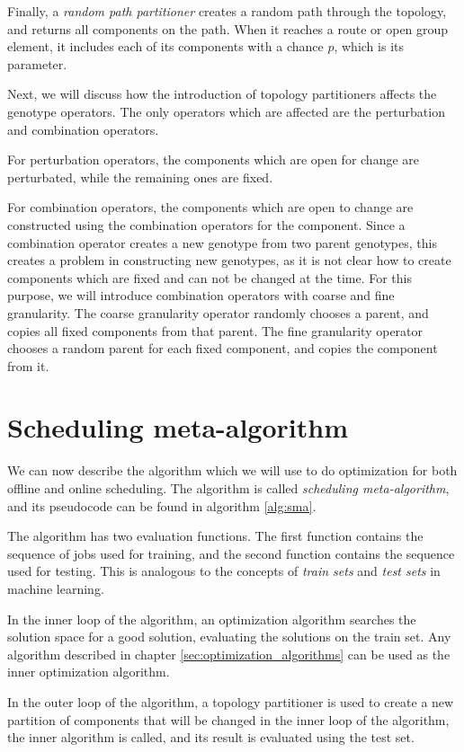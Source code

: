 Finally, a \textit{random path partitioner} creates a random path through the topology, and returns all components on the path. When it reaches a route or open group element, it includes each of its components with a chance $p$, which is its parameter.

Next, we will discuss how the introduction of topology partitioners affects the genotype operators. The only operators which are affected are the perturbation and combination operators.

For perturbation operators, the components which are open for change are perturbated, while the remaining ones are fixed. 

For combination operators, the components which are open to change are constructed using the combination operators for the component. Since a combination operator creates a new genotype from two parent genotypes, this creates a problem in constructing new genotypes, as it is not clear how to create components which are fixed and can not be changed at the time. For this purpose, we will introduce combination operators with coarse and fine granularity. The coarse granularity operator randomly chooses a parent, and copies all fixed components from that parent. The fine granularity operator chooses a random parent for each fixed component, and copies the component from it.

\section{Scheduling meta-algorithm}
\label{sec:scheduling_meta_algorithm}

We can now describe the algorithm which we will use to do optimization for both offline and online scheduling. The algorithm is called \textit{scheduling meta-algorithm}, and its pseudocode can be found in algorithm \ref{alg:sma}.

The algorithm has two evaluation functions. The first function contains the sequence of jobs used for training, and the second function contains the sequence used for testing. This is analogous to the concepts of \textit{train sets} and \textit{test sets} in machine learning.

In the inner loop of the algorithm, an optimization algorithm searches the solution space for a good solution, evaluating the solutions on the train set. Any algorithm described in chapter \ref{sec:optimization_algorithms} can be used as the inner optimization algorithm.

In the outer loop of the algorithm, a topology partitioner is used to create a new partition of components that will be changed in the inner loop of the algorithm, the inner algorithm is called, and its result is evaluated using the test set. 

